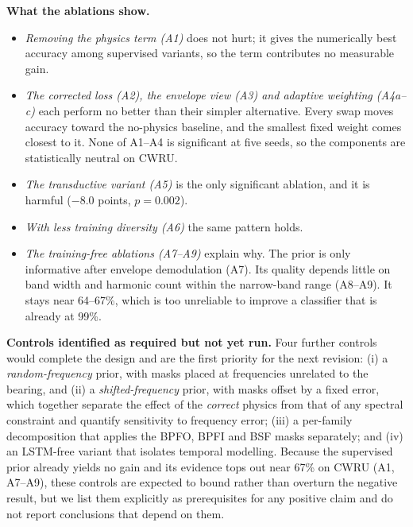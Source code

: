 \documentclass[conference]{IEEEtran}
\begin{document}
\textbf{What the ablations show.}
\begin{itemize}
\item \emph{Removing the physics term (A1)} does not hurt; it gives the
numerically best accuracy among supervised variants, so the term contributes
no measurable gain.
\item \emph{The corrected loss (A2), the envelope view (A3) and adaptive
weighting (A4a--c)} each perform no better than their simpler alternative.
Every swap moves accuracy toward the no-physics baseline, and the smallest
fixed weight comes closest to it. None of A1--A4 is significant at five seeds,
so the components are statistically neutral on CWRU.
\item \emph{The transductive variant (A5)} is the only significant ablation,
and it is harmful ($-8.0$ points, $p=0.002$).
\item \emph{With less training diversity (A6)} the same pattern holds.
\item \emph{The training-free ablations (A7--A9)} explain why. The prior is
only informative after envelope demodulation (A7). Its quality depends little
on band width and harmonic count within the narrow-band range (A8--A9).
It stays near 64--67\%, which is too unreliable to improve a classifier that
is already at 99\%.
\end{itemize}

\textbf{Controls identified as required but not yet run.} Four further controls
would complete the design and are the first priority for the next revision:
(i) a \emph{random-frequency} prior, with masks placed at frequencies unrelated
to the bearing, and (ii) a \emph{shifted-frequency} prior, with masks offset by
a fixed error, which together separate the effect of the \emph{correct} physics
from that of any spectral constraint and quantify sensitivity to frequency
error; (iii) a per-family decomposition that applies the BPFO, BPFI and BSF
masks separately; and (iv) an LSTM-free variant that isolates temporal
modelling. Because the supervised prior already yields no gain and its evidence
tops out near 67\% on CWRU (A1, A7--A9), these controls are expected to bound
rather than overturn the negative result, but we list them explicitly as
prerequisites for any positive claim and do not report conclusions that depend
on them.

\end{document}
